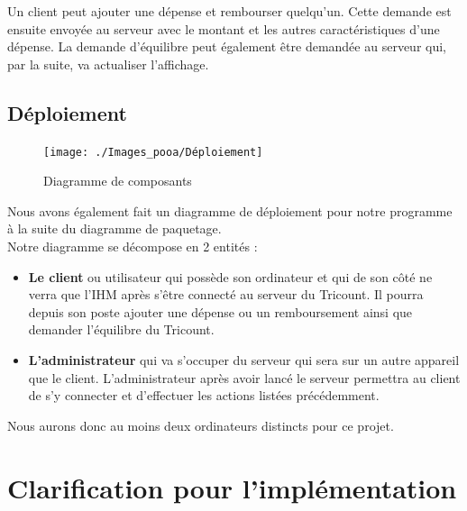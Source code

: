 \documentclass[12,french]{report}
\begin{document}
Un client peut ajouter une dépense et rembourser quelqu’un. Cette demande est ensuite envoyée au serveur avec le montant et les autres caractéristiques d’une dépense. 
La demande d’équilibre peut également être demandée au serveur qui, par la suite, va actualiser l’affichage. 

\section{Déploiement}

\begin{figure}[H]
	\center
	\texttt{[image: ./Images\_pooa/Déploiement]}
	\caption{Diagramme de composants}
\end{figure}\vspace{0.2cm}

Nous avons également fait un diagramme de déploiement pour notre programme à la suite du diagramme de paquetage. \\

Notre diagramme se décompose en 2 entités : 
\begin{itemize}[label=\textbullet]
\item \textbf{Le client} ou utilisateur qui possède son ordinateur et qui de son côté ne verra que l’IHM après s’être connecté au serveur du Tricount. Il pourra depuis son poste ajouter une dépense ou un remboursement ainsi que demander l’équilibre du Tricount.\\
\item \textbf{L’administrateur} qui va s’occuper du serveur qui sera sur un autre appareil que le client. L’administrateur après avoir lancé le serveur permettra au client de s’y connecter et d’effectuer les actions listées précédemment. 

\end{itemize}\vspace{0.2cm}

Nous aurons donc au moins deux ordinateurs distincts pour ce projet.

\chapter{Clarification pour l'implémentation}
\end{document}
